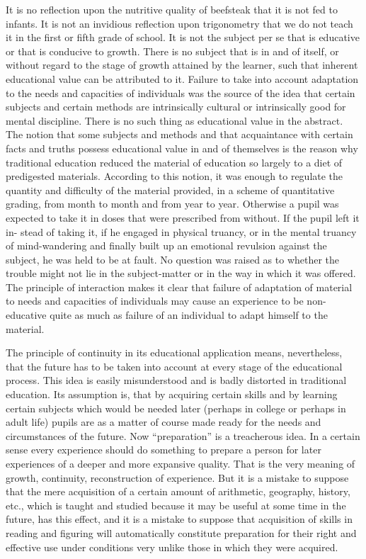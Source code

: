 It is no reflection upon the nutritive quality of beefsteak that it is not fed to infants. It 
is not an invidious reflection upon trigonometry that we do not teach it in the first or fifth 
grade of school. It is not the subject per se that is educative or that is conducive to growth. There is no subject that is in and of itself, or without regard to the stage of 
growth attained by the learner, such that inherent educational value can be attributed to it. 
Failure to take into account adaptation to the needs and capacities of individuals was the 
source of the idea that certain subjects and certain methods are intrinsically cultural or 
intrinsically good for mental discipline. There is no such thing as educational value in the 
abstract. The notion that some subjects and methods and that acquaintance with certain 
facts and truths possess educational value in and of themselves is the reason why 
traditional education reduced the material of education so largely to a diet of predigested 
materials. According to this notion, it was enough to regulate the quantity and difficulty 
of the material provided, in a scheme of quantitative grading, from month to month and 
from year to year. Otherwise a pupil was expected to take it in doses that were prescribed 
from without. If the pupil left it in- stead of taking it, if he engaged in physical truancy, or 
in the mental truancy of mind-wandering and finally built up an emotional revulsion 
against the subject, he was held to be at fault. No question was raised as to whether the 
trouble might not lie in the subject-matter or in the way in which it was offered. The 
principle of interaction makes it clear that failure of adaptation of material to needs and 
capacities of individuals may cause an experience to be non-educative quite as much as 
failure of an individual to adapt himself to the material. 

The principle of continuity in its educational application means, nevertheless, that the 
future has to be taken into account at every stage of the educational process. This idea is 
easily misunderstood and is badly distorted in traditional education. Its assumption is, 
that by acquiring certain skills and by learning certain subjects which would be needed 
later (perhaps in college or perhaps in adult life) pupils are as a matter of course made 
ready for the needs and circumstances of the future. Now \enquote{preparation} is a treacherous
idea. In a certain sense every experience should do something to prepare a person for 
later experiences of a deeper and more expansive quality. That is the very meaning of 
growth, continuity, reconstruction of experience. But it is a mistake to suppose that the 
mere acquisition of a certain amount of arithmetic, geography, history, etc., which is 
taught and studied because it may be useful at some time in the future, has this effect, and 
it is a mistake to suppose that acquisition of skills in reading and figuring will 
automatically constitute preparation for their right and effective use under conditions 
very unlike those in which they were acquired. 

